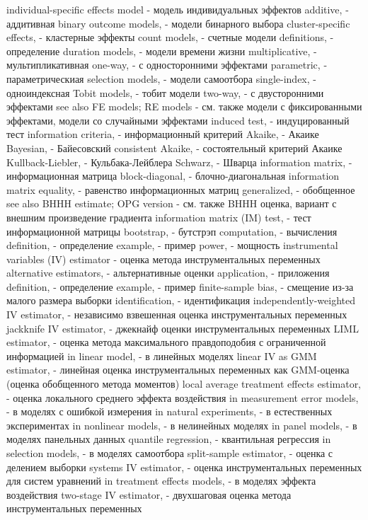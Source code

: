 individual-specific effects model - модель индивидуальных эффектов
additive, - аддитивная
binary outcome models, - модели бинарного выбора
cluster-specific effects, - кластерные эффекты
count models, - счетные модели
definitions, - определение
duration models, - модели времени жизни
multiplicative, - мультипликативная
one-way, - с односторонними эффектами
parametric, - параметрическиая
selection models, - модели самоотбора
single-index, - одноиндексная
Tobit models, - тобит модели
two-way, - с двусторонними эффектами
see also FE models; RE models - см. также модели с фиксированными эффектами, модели со случайными эффектами
induced test, - индуцированный тест
information criteria, - информационный критерий
Akaike, - Акаике
Bayesian, - Байесовский
consistent Akaike, - состоятельный критерий Акаике
Kullback-Liebler, - Кульбака-Лейблера
Schwarz, - Шварца
information matrix, - информационная матрица
block-diagonal, - блочно-диагональная
information matrix equality, - равенство информационных матриц
generalized, - обобщенное
see also BHHH estimate; OPG version - см. также BHHH оценка, вариант с внешним произведение градиента
information matrix (IM) test, - тест информационной матрицы
bootstrap, - бутстрэп
computation, - вычисления
definition, - определение
example, - пример
power, - мощность
instrumental variables (IV) estimator - оценка метода инструментальных переменных
alternative estimators, - альтернативные оценки
application, - приложения
definition, - определение
example, - пример
finite-sample bias, - смещение из-за малого размера выборки
identification, - идентификация
independently-weighted IV estimator, - независимо взвешенная оценка инструментальных переменных
jackknife IV estimator, - джекнайф оценки инструментальных переменных
LIML estimator, - оценка метода максимального правдоподобия с ограниченной информацией
in linear model, - в линейных моделях
linear IV as GMM estimator, - линейная оценка инструментальных переменных как GMM-оценка (оценка обобщенного метода моментов)
local average treatment effects estimator, - оценка локального среднего эффекта воздействия
in measurement error models, - в моделях с ошибкой измерения
in natural experiments, - в естественных экспериментах
in nonlinear models, - в нелинейных моделях
in panel models, - в моделях панельных данных
quantile regression, - квантильная регрессия
in selection models, - в моделях самоотбора
split-sample estimator, - оценка с делением выборки
systems IV estimator, - оценка инструментальных переменных для систем уравнений
in treatment effects models, - в моделях эффекта воздействия
two-stage IV estimator, - двухшаговая оценка метода инструментальных переменных
